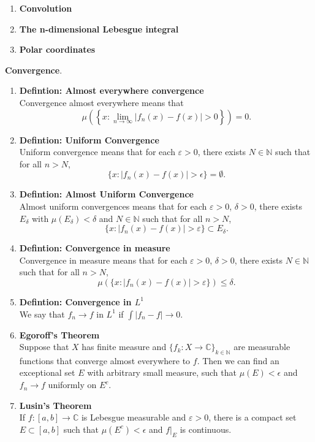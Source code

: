\documentclass{article}
\begin{document}
\begin{enumerate}
  \item \textbf{Convolution}\\

  \item \textbf{The n-dimensional Lebesgue integral}\\

  \item \textbf{Polar coordinates}\\
\end{enumerate}

\textbf{Convergence}.
\begin{enumerate}
  \item \textbf{Defintion: Almost everywhere convergence}\\
    Convergence almost everywhere means that \[
      \mu\left(\left\{x : \lim_{n\rightarrow{\infty}} |f_n(x) - f(x)|  > 0\right\}\right) = 0.
    \]
  \item \textbf{Defintion: Uniform Convergence}\\
    Uniform convergence means that for each $\varepsilon > 0$,
    there exists $N \in \mathbb N$ such that for all $n > N$, \[
      \{ x : |f_n(x) - f(x)| > \epsilon \} = \emptyset.
    \]
  \item \textbf{Defintion: Almost Uniform Convergence}\\
    Almost uniform convergences means that for each $\varepsilon > 0$, $\delta > 0$,
    there exists $E_\delta$ with $\mu(E_\delta) < \delta$ and
    $N \in \mathbb N$ such that for all $n > N$, \[
      \{x : |f_n(x) - f(x)| > \varepsilon\} \subset E_\delta.
    \]
  \item \textbf{Defintion: Convergence in measure}\\
    Convergence in measure means that for each $\varepsilon > 0$, $\delta > 0$,
    there exists $N \in \mathbb N$ such that for all $n > N$, \[
      \mu(\{x : |f_n(x) - f(x)| > \varepsilon\}) \leq \delta.
    \]
  \item \textbf{Defintion: Convergence in $L^1$}\\
    We say that $f_n \rightarrow f$ in $L^1$ if $\int |f_n - f| \rightarrow 0$.

  \item \textbf{Egoroff's Theorem}\\
    Suppose that $X$ has finite measure and
    $\{ f_k\colon X\rightarrow\mathbb C \}_{k \in \mathbb N}$ are
    measurable functions that converge almost everywhere to $f$. Then we can
    find an exceptional set $E$ with arbitrary small measure, such that
    $\mu(E) < \epsilon$ and $f_n \rightarrow f$ uniformly on $E^c$.
  \item \textbf{Lusin's Theorem}\\
    If $f\colon[a,b]\rightarrow \mathbb C$ is Lebesgue measurable and
    $\varepsilon > 0$, there is a compact set $E \subset [a, b]$ such that
    $\mu(E^c) < \epsilon$ and $f|_E$ is continuous.
\end{enumerate}
\end{document}
